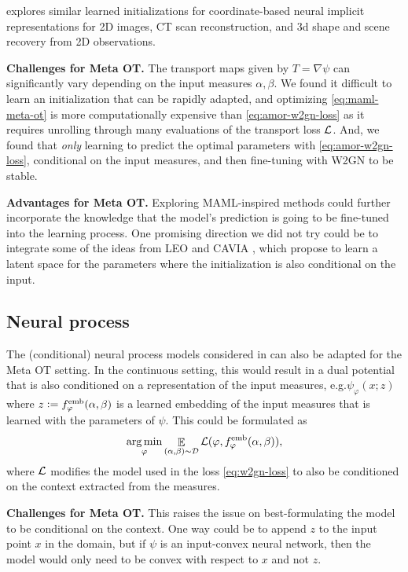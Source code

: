 \documentclass{article}
\newcommand{\eg}{e.g.\xspace}
\newcommand{\defeq}{\vcentcolon=}
\begin{document}
\citet{tancik2021learned} explores similar learned initializations
for coordinate-based neural implicit representations for 2D images,
CT scan reconstruction, and 3d shape and scene recovery from 2D observations.

\textbf{Challenges for Meta OT.}
The transport maps given by $T=\nabla\psi$ can significantly
vary depending on the input measures $\alpha,\beta$.
We found it difficult to learn an initialization that can be rapidly
adapted, and optimizing \cref{eq:maml-meta-ot} is
more computationally expensive than
\cref{eq:amor-w2gn-loss} as it requires unrolling through many
evaluations of the transport loss ${\mathcal{L}}$.
And, we found that \emph{only} learning to predict the optimal
parameters with \cref{eq:amor-w2gn-loss}, conditional on the input measures,
and then fine-tuning with W2GN to be stable.

\textbf{Advantages for Meta OT.}
Exploring MAML-inspired methods could further incorporate the knowledge
that the model's prediction is going to be fine-tuned into the
learning process.
One promising direction we did not try could be to integrate
some of the ideas from
LEO \citep{rusu2018meta} and CAVIA \citep{zintgraf2019fast},
which propose to learn a latent space for the parameters
where the initialization is also conditional on the input.

\subsection{Neural process}
The (conditional) neural process models considered in \citet{garnelo2018neural,garnelo2018conditional}
can also be adapted for the Meta OT setting.
In the continuous setting, this would result in a
dual potential that is also conditioned on a representation
of the input measures, \eg $\psi_\varphi(x; z)$ where
$z\defeq f^{\rm emb}_\varphi(\alpha, \beta)$ is a learned embedding
of the input measures that is learned with the parameters of $\psi$.
This could be formulated as
\begin{equation}
  \operatorname*{arg\,min}_\varphi \mathop{\mathbb{E}}_{(\alpha,\beta)\sim{\mathcal{D}}} {\mathcal{L}}(\varphi, f^{\rm emb}_\varphi(\alpha, \beta)),
  \label{eq:neural-process-meta-ot}
\end{equation}
where ${\mathcal{L}}$ modifies the model used in the loss \cref{eq:w2gn-loss} to
also be conditioned on the context extracted from the measures.

\textbf{Challenges for Meta OT.}
This raises the issue on best-formulating the model to be conditional
on the context. One way could be to append $z$ to the input
point $x$ in the domain, but if $\psi$ is an input-convex neural network,
then the model would only need to be convex with respect to $x$
and not $z$.
\end{document}
